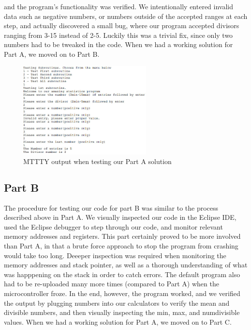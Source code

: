 \documentclass[letterpaper]{article}
\begin{document}
    and the program's functionality was verified. We intentionally
    entered invalid data such as negative numbers, or numbers outside of the accepted ranges
    at each step, and actually discovered a small bug, where
    our program accepted divisors ranging from 3-15 instead of 2-5. Luckily this
    was a trivial fix, since only two numbers had to be tweaked in the code.
    When we had a working solution for Part A, we moved on to Part B.

    \begin{figure}[H]
      \centering
      \includegraphics[width=0.6\textwidth]{parta.jpg}
      \caption{MTTTY output when testing our Part A solution}
    \end{figure}

  \subsection{Part B}
    The procedure for testing our code for part B was similar to the process
    described above in Part A. We visually inspected our code in the Eclipse IDE,
    used the Eclipse debugger to step through our code, and monitor relevant
    memory addresses and registers. This part certainly proved to
    be more involved than Part A, in that a brute force approach to
    stop the program from crashing would take too long. Deeeper inspection
    was required when monitoring the memory addresses and stack pointer, as
    well as a thorough understanding of what was happpening on the stack
    in order to catch errors. The default program also had to
    be re-uploaded many more times (compared to Part A) when the microcontroller froze.
    In the end, however, the program worked, and we verified the output
    by plugging numbers into our calculators to verify the mean and divisible numbers,
    and then visually inspecting the min, max, and numdivisible values.
    When we had a working solution for Part A, we moved on to Part C.
\end{document}
